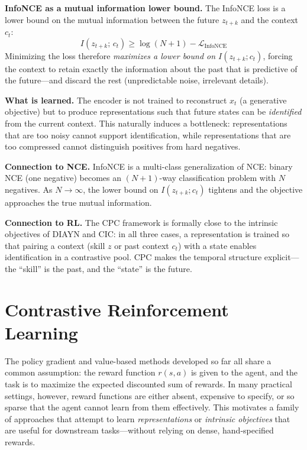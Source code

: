 \documentclass[11pt, letterpaper]{article}
\begin{document}
\begin{remark}
    \textbf{InfoNCE as a mutual information lower bound.} The InfoNCE loss is a lower bound on the mutual information between the future \(z_{t+k}\) and the context \(c_t\):
    \[
        I(z_{t+k};\, c_t) \geq \log(N+1) - \mathcal{L}_{\text{InfoNCE}}
    \]
    Minimizing the loss therefore \textit{maximizes a lower bound on \(I(z_{t+k}; c_t)\)}, forcing the context to retain exactly the information about the past that is predictive of the future---and discard the rest (unpredictable noise, irrelevant details).

    \textbf{What is learned.} The encoder is not trained to reconstruct \(x_t\) (a generative objective) but to produce representations such that future states can be \textit{identified} from the current context. This naturally induces a bottleneck: representations that are too noisy cannot support identification, while representations that are too compressed cannot distinguish positives from hard negatives.

    \textbf{Connection to NCE.} InfoNCE is a multi-class generalization of NCE: binary NCE (one negative) becomes an \((N+1)\)-way classification problem with \(N\) negatives. As \(N \to \infty\), the lower bound on \(I(z_{t+k}; c_t)\) tightens and the objective approaches the true mutual information.

    \textbf{Connection to RL.} The CPC framework is formally close to the intrinsic objectives of DIAYN and CIC: in all three cases, a representation is trained so that pairing a context (skill \(z\) or past context \(c_t\)) with a state enables identification in a contrastive pool. CPC makes the temporal structure explicit---the ``skill'' is the past, and the ``state'' is the future.
\end{remark}

\newpage
\section{Contrastive Reinforcement Learning}
 
The policy gradient and value-based methods developed so far all share a common assumption: the reward function \(r(s, a)\) is given to the agent, and the task is to maximize the expected discounted sum of rewards. In many practical settings, however, reward functions are either absent, expensive to specify, or so sparse that the agent cannot learn from them effectively. This motivates a family of approaches that attempt to learn \textit{representations} or \textit{intrinsic objectives} that are useful for downstream tasks---without relying on dense, hand-specified rewards.
 
\end{document}
